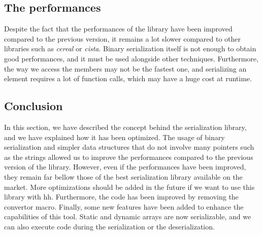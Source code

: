 \subsection{The performances}

Despite the fact that the performances of the library have been improved
compared to the previous version, it remains a lot slower compared to other
libraries such as \textit{cereal} or \textit{cista}. Binary serialization itself
is not enough to obtain good performances, and it must be used alongside other
techniques. Furthermore, the way we access the members may not be the fastest
one, and serializing an element requires a lot of function calls, which may have
a huge cost at runtime.

\subsection{Conclusion}

In this section, we have described the concept behind the serialization library,
and we have explained how it has been optimized. The usage of binary
serialization and simpler data structures that do not involve many pointers such
as the strings allowed us to improve the performances compared to the previous
version of the library. However, even if the performances have been improved,
they remain far bellow those of the best serialization library available on the
market. More optimizations should be added in the future if we want to use this
library with \gls{hh}. Furthermore, the code has been improved by removing the
convertor macro. Finally, some new features have been added to enhance the
capabilities of this tool. Static and dynamic arrays are now serializable, and
we can also execute code during the serialization or the deserialization.
